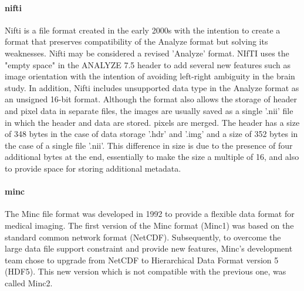 \paragraph{\ac{nifti}}
Nifti is a file format created in the early 2000s with the intention to create a format that preserves compatibility of the Analyze format but solving its weaknesses. Nifti may be considered a revised 'Analyze' format. NIfTI uses the "empty space" in the ANALYZE 7.5 header to add several new features such as image orientation with the intention of avoiding left-right ambiguity in the brain study. In addition, Nifti includes unsupported data type in the Analyze format as an unsigned 16-bit format. Although the format also allows the storage of header and pixel data in separate files, the images are usually saved as a single '.nii' file in which the header and data are stored. pixels are merged. The header has a size of 348 bytes in the case of data storage '.hdr' and '.img' and a size of 352 bytes in the case of a single file '.nii'. This difference in size is due to the presence of four additional bytes at the end, essentially to make the size a multiple of 16, and also to provide space for storing additional metadata.\cite{NIF:1,ME:1}
\paragraph{\ac{minc}}
The Minc file format was developed in 1992 to provide a flexible data format for medical imaging. The first version of the Minc format (Minc1) was based on the standard common network format (NetCDF). Subsequently, to overcome the large data file support constraint and provide new features, Minc's development team chose to upgrade from NetCDF to Hierarchical Data Format version 5 (HDF5). This new version which is not compatible with the previous one, was called Minc2.\cite{MIN:1,ME:1}
